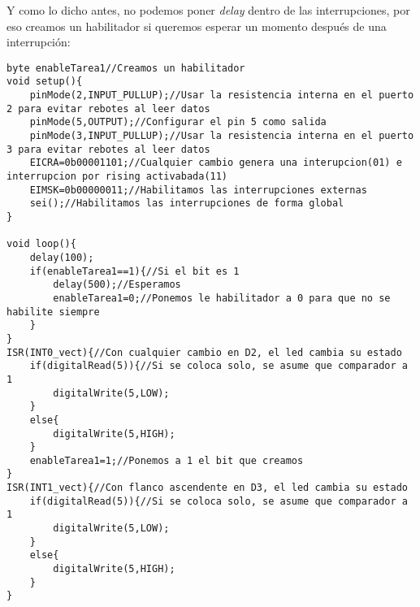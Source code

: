 \documentclass[
	12pt, %
	fleqn, %
	a4paper, %
	oneside, %
]{LegrandOrangeBook}
\begin{document}
Y como lo dicho antes, no podemos poner \textit{delay} dentro de las interrupciones, por eso creamos un habilitador si queremos esperar un momento después de una interrupción:
\begin{lstlisting}[language=Arduino,caption={Interrupciones y delays}]
byte enableTarea1//Creamos un habilitador
void setup(){
	pinMode(2,INPUT_PULLUP);//Usar la resistencia interna en el puerto 2 para evitar rebotes al leer datos
	pinMode(5,OUTPUT);//Configurar el pin 5 como salida
	pinMode(3,INPUT_PULLUP);//Usar la resistencia interna en el puerto 3 para evitar rebotes al leer datos
	EICRA=0b00001101;//Cualquier cambio genera una interupcion(01) e interrupcion por rising activabada(11)
	EIMSK=0b00000011;//Habilitamos las interrupciones externas
	sei();//Habilitamos las interrupciones de forma global
}	

void loop(){
	delay(100);
	if(enableTarea1==1){//Si el bit es 1
		delay(500);//Esperamos
		enableTarea1=0;//Ponemos le habilitador a 0 para que no se habilite siempre
	}
}
ISR(INT0_vect){//Con cualquier cambio en D2, el led cambia su estado
	if(digitalRead(5)){//Si se coloca solo, se asume que comparador a 1
		digitalWrite(5,LOW);
	}
	else{
		digitalWrite(5,HIGH);
	}
	enableTarea1=1;//Ponemos a 1 el bit que creamos
}
ISR(INT1_vect){//Con flanco ascendente en D3, el led cambia su estado
	if(digitalRead(5)){//Si se coloca solo, se asume que comparador a 1
		digitalWrite(5,LOW);
	}
	else{
		digitalWrite(5,HIGH);
	}
}
\end{lstlisting}
\end{document}
